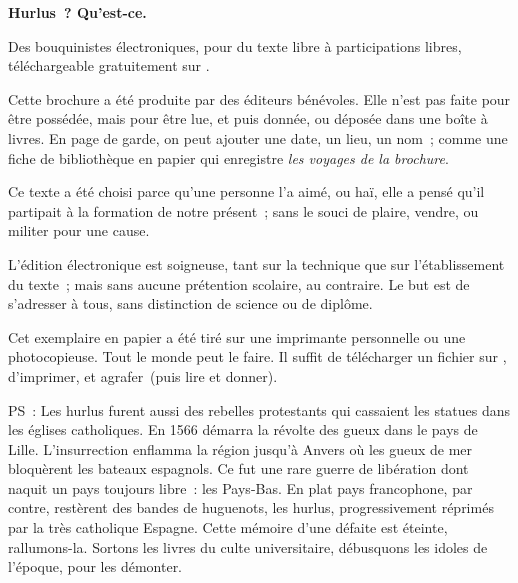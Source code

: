 \documentclass[french,twoside]{book} %
\begin{document}
  \hbox{}\newpage
  \ifodd\value{page}\hbox{}\newpage\fi
  {\centering\color{rubric}\bfseries\noindent\large
    Hurlus ? Qu’est-ce.\par
    \bigskip
  }
  \noindent Des bouquinistes électroniques, pour du texte libre à participations libres,
  téléchargeable gratuitement sur \href{https://hurlus.fr}{}.\par
  \bigskip
  \noindent Cette brochure a été produite par des éditeurs bénévoles.
  Elle n’est pas faite pour être possédée, mais pour être lue, et puis donnée, ou déposée dans une boîte à livres.
  En page de garde, on peut ajouter une date, un lieu, un nom ;
  comme une fiche de bibliothèque en papier qui enregistre \emph{les voyages de la brochure}.
  \par

  Ce texte a été choisi parce qu’une personne l’a aimé,
  ou haï, elle a pensé qu’il partipait à la formation de notre présent ;
  sans le souci de plaire, vendre, ou militer pour une cause.
  \par

  L’édition électronique est soigneuse, tant sur la technique
  que sur l’établissement du texte ; mais sans aucune prétention scolaire, au contraire.
  Le but est de s’adresser à tous, sans distinction de science ou de diplôme.
  \par

  Cet exemplaire en papier a été tiré sur une imprimante personnelle
   ou une photocopieuse. Tout le monde peut le faire.
  Il suffit de
  télécharger un fichier sur \href{https://hurlus.fr}{},
  d’imprimer, et agrafer (puis lire et donner).\par

  \bigskip

  \noindent PS : Les hurlus furent aussi des rebelles protestants qui cassaient les statues dans les églises catholiques. En 1566 démarra la révolte des gueux dans le pays de Lille. L’insurrection enflamma la région jusqu’à Anvers où les gueux de mer bloquèrent les bateaux espagnols.
  Ce fut une rare guerre de libération dont naquit un pays toujours libre : les Pays-Bas.
  En plat pays francophone, par contre, restèrent des bandes de huguenots, les hurlus, progressivement réprimés par la très catholique Espagne.
  Cette mémoire d’une défaite est éteinte, rallumons-la. Sortons les livres du culte universitaire, débusquons les idoles de l’époque, pour les démonter.
\fi
\end{document}
